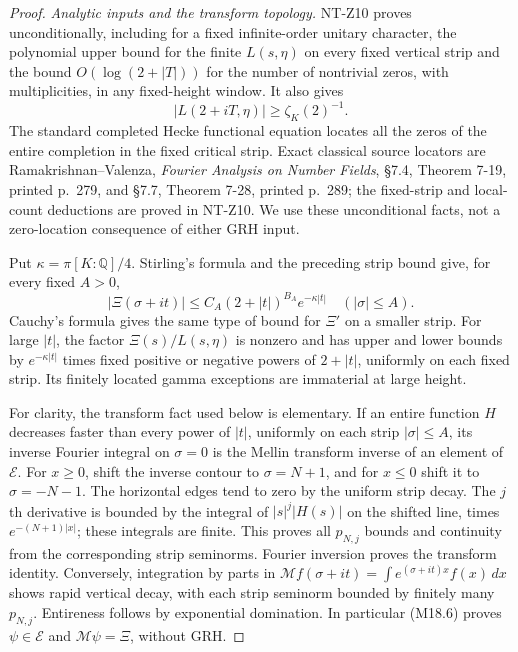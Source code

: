 \documentclass[11pt,a4paper]{article}
\begin{document}
\begin{proof}
\emph{Analytic inputs and the transform topology.}
NT-Z10 proves unconditionally, including for a fixed
infinite-order unitary character, the polynomial upper bound
for the finite \(L(s,\eta)\) on every fixed vertical strip and
the bound \(O(\log(2+|T|))\) for the number of nontrivial
zeros, with multiplicities, in any fixed-height window.
It also gives
\[
                   |L(2+iT,\eta)|\ge\zeta_K(2)^{-1}.              \tag{M18.5}
\]
The standard completed Hecke functional equation locates all
the zeros of the entire completion in the fixed critical strip.
Exact classical source locators are Ramakrishnan--Valenza,
\emph{Fourier Analysis on Number Fields}, \S7.4,
Theorem 7-19, printed p.~279, and \S7.7, Theorem 7-28,
printed p.~289; the fixed-strip and local-count deductions
are proved in NT-Z10.  We use these unconditional facts,
not a zero-location consequence of either GRH input.

Put \(\kappa=\pi[K:\mathbb Q]/4\).  Stirling's formula and
the preceding strip bound give, for every fixed \(A>0\),
\[
 |\Xi(\sigma+it)|\le C_A(2+|t|)^{B_A}e^{-\kappa|t|}
                         \quad(|\sigma|\le A).                  \tag{M18.6}
\]
Cauchy's formula gives the same type of bound for \(\Xi'\)
on a smaller strip.  For large \(|t|\), the factor
\(\Xi(s)/L(s,\eta)\) is nonzero and has upper and lower
bounds by \(e^{-\kappa|t|}\) times fixed positive or negative
powers of \(2+|t|\), uniformly on each fixed strip.  Its
finitely located gamma exceptions are immaterial at large
height.

For clarity, the transform fact used below is elementary.
If an entire function \(H\) decreases faster than every
power of \(|t|\), uniformly on each strip \(|\sigma|\le A\),
its inverse Fourier integral on \(\sigma=0\) is the Mellin
transform inverse of an element of \(\mathcal E\).
For \(x\ge0\), shift the inverse contour to
\(\sigma=N+1\), and for \(x\le0\) shift it to
\(\sigma=-N-1\).  The horizontal edges tend to zero by the
uniform strip decay.  The \(j\)th derivative is bounded
by the integral of \(|s|^j|H(s)|\) on the shifted line,
times \(e^{-(N+1)|x|}\); these integrals are finite.
This proves all \(p_{N,j}\) bounds and continuity from the
corresponding strip seminorms.  Fourier inversion proves
the transform identity.  Conversely, integration by parts
in \(\mathcal Mf(\sigma+it)=\int e^{(\sigma+it)x}f(x)\,dx\)
shows rapid vertical decay, with each strip seminorm
bounded by finitely many \(p_{N,j}\).  Entireness follows
by exponential domination.  In particular (M18.6) proves
\(\psi\in\mathcal E\) and \(\mathcal M\psi=\Xi\), without GRH.


\end{proof}
\end{document}
